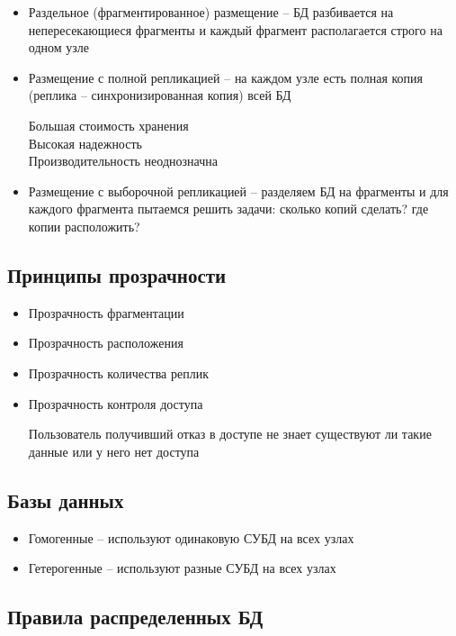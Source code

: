 \documentclass[12pt, a4paper]{article}
\begin{document}
\begin{itemize}
    \item Раздельное (фрагментированное) размещение -- БД разбивается на непересекающиеся фрагменты и каждый фрагмент располагается строго на одном узле
    
    \item Размещение с полной репликацией -- на каждом узле есть полная копия (реплика -- синхронизированная копия) всей БД
    
    Большая стоимость хранения\\
    Высокая надежность\\
    Производительность неоднозначна \\

    \item Размещение с выборочной репликацией -- разделяем БД на фрагменты и для каждого фрагмента пытаемся решить задачи: сколько копий сделать? где копии расположить?
    
\end{itemize}

\subsection{Принципы прозрачности}

\begin{itemize}
    \item Прозрачность фрагментации
    \item Прозрачность расположения
    \item Прозрачность количества реплик
    \item Прозрачность контроля доступа
    
    Пользователь получивший отказ в доступе не знает существуют ли такие данные или у него нет доступа
    
    
\end{itemize}

\subsection{Базы данных}
\begin{itemize}
    \item Гомогенные -- используют одинаковую СУБД на всех узлах
    \item Гетерогенные -- используют разные СУБД на всех узлах
\end{itemize}

\subsection{Правила распределенных БД}
\end{document}
